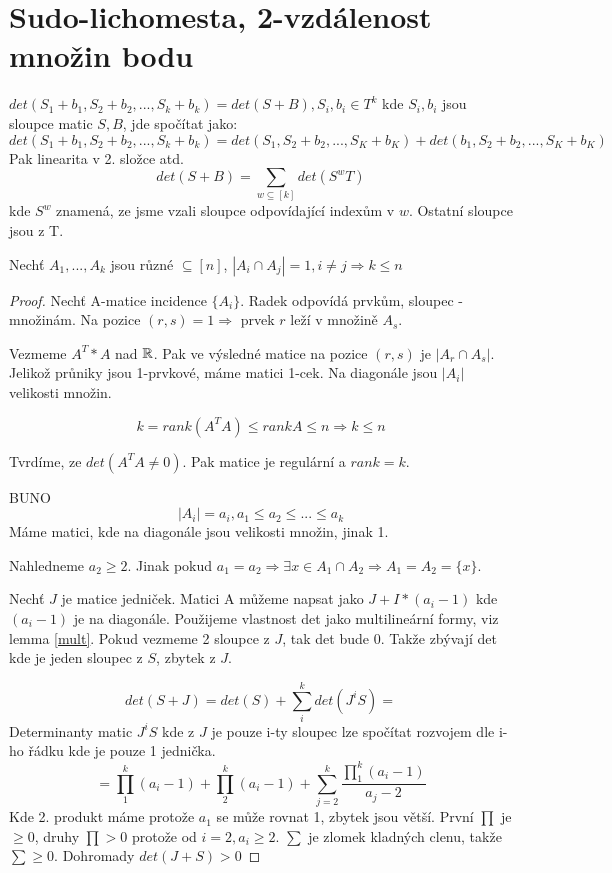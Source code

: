 \section{\texorpdfstring{Sudo-lichomesta, 2-vzdálenost množin bodu}{Sudo-lichomesta, 2-vzdálenost množin bodu}}
\vspace{5mm}
\large


\begin{lemma}\label{mult}
	$det(S_1 + b_1, S_2 + b_2 , ... , S_k + b_k) = det(S + B), S_i, b_i \in T^k$ kde $S_i,b_i$ jsou sloupce matic $S, B$, jde spočítat jako:
	\[ det(S_1 + b_1, S_2 + b_2 , ... , S_k + b_k) = det(S_1, S_2 + b_2 , ... , S_K + b_K) + det(b_1, S_2 + b_2 , ... , S_K + b_K) \]
	Pak linearita v 2. složce atd.
	\[ det(S + B) = \sum_{w \subseteq [k]} det(S^wT) \]
	kde $S^w$ znamená, ze jsme vzali sloupce odpovídající indexům v $w$. Ostatní sloupce jsou z T.
\end{lemma}


\begin{theorem}
	Nechť $A_1, ... , A_k$ jsou různé $ \subseteq [n]$, $ |A_i \cap A_j| = 1, i \ne j \Rightarrow k \leq n$
\end{theorem}
\begin{proof}
	Nechť A-matice incidence $\{A_i\}$. Radek odpovídá prvkům, sloupec - množinám. Na pozice $(r,s) = 1 \Rightarrow$ prvek $r$ leží v množině $A_s$.

	Vezmeme $A^T * A$ nad $\operatorname{\mathbb{R}}$. Pak ve výsledné matice na pozice $(r,s)$ je $|A_r \cap A_s|$. Jelikož průniky jsou 1-prvkové, máme matici 1-cek. Na diagonále jsou $|A_i|$ velikosti množin.

	\[ k = rank(A^TA) \leq rank A \leq n \Rightarrow k \leq n \]

	Tvrdíme, ze $det(A^TA \ne 0)$. Pak matice je regulární a $rank = k$.

	BUNO
	\[|A_i| = a_i, a_1 \leq a_2 \leq ... \leq a_k\]
	Máme matici, kde na diagonále jsou velikosti množin, jinak 1.

	Nahledneme $a_2 \geq 2$. Jinak pokud $a_1 = a_2 \Rightarrow \exists x \in A_1 \cap A_2 \Rightarrow A_1 = A_2 = \{ x \} $.

	Nechť $J$ je matice jedniček. Matici A můžeme napsat jako $J + I*(a_i - 1)$ kde $(a_i - 1)$ je na diagonále.
	Použijeme vlastnost det jako multilineární formy, viz lemma \cref{mult}. Pokud vezmeme 2 sloupce z $J$, tak det bude 0. Takže zbývají det kde je jeden sloupec z $S$, zbytek z $J$.

	\[ det(S + J) = det(S) + \sum_i^k det(J^iS) = \]
	Determinanty matic $J^iS$ kde z $J$ je pouze i-ty sloupec lze spočítat rozvojem dle i-ho řádku kde je pouze 1 jednička.
	\[ = \prod_1^k (a_i - 1) + \prod_2^k (a_i - 1) + \sum_{j=2}^k \frac{\prod_1^k (a_i - 1)}{a_j - 2} \]
	Kde 2. produkt máme protože $a_1$ se může rovnat 1, zbytek jsou větší. První $\prod$ je $\geq 0$, druhy $\prod > 0$ protože od $i = 2, a_i \geq 2$. $\sum$ je zlomek kladných clenu, takže $\sum \geq 0$. Dohromady $ det(J + S) > 0$

\end{proof}

